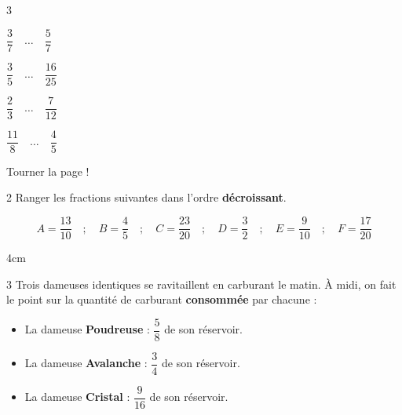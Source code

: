 \documentclass[a4paper]{book}
\begin{document}
{\begin{exerciceNote}{3}
        \begin{minipage}{0.24\linewidth}
            $\dfrac{3}{7} \quad \dots \quad \dfrac{5}{7}$
            \vspace{4cm}
        \end{minipage}
        \hfill\vline\hfill
        \begin{minipage}{0.24\linewidth}
            $\dfrac{3}{5} \quad \dots \quad \dfrac{16}{25}$
            \vspace{4cm}
        \end{minipage}        
        \hfill\vline\hfill
        \begin{minipage}{0.24\linewidth}
            $\dfrac{2}{3} \quad \dots \quad \dfrac{7}{12}$
            \vspace{4cm}
        \end{minipage}
        \hfill\vline\hfill
        \begin{minipage}{0.24\linewidth}
            $\dfrac{11}{8} \quad \dots \quad \dfrac{4}{5}$
            \vspace{4cm}
        \end{minipage}
    \end{exerciceNote}


\hfill Tourner la page !


\newpage


    \begin{exerciceNote}{2}
        Ranger les fractions suivantes dans l'ordre \textbf{décroissant}.
            
        \[ A = \frac{13}{10} \quad ; \quad B = \frac{4}{5} \quad ; \quad C = \frac{23}{20} \quad ; \quad D = \frac{3}{2} \quad ; \quad E = \frac{9}{10} \quad ; \quad F = \frac{17}{20} \]
        
        \begin{ZoneReponse}{4cm}
        \end{ZoneReponse}
    \end{exerciceNote}


    \begin{exerciceNote}{3}
        Trois dameuses identiques se ravitaillent en carburant le matin. À midi, on fait le point sur la quantité de carburant \textbf{consommée} par chacune :
        \begin{itemize}
            \item La dameuse \textbf{Poudreuse} : $\dfrac{5}{8}$ de son réservoir.
            \item La dameuse \textbf{Avalanche} : $\dfrac{3}{4}$ de son réservoir.
            \item La dameuse \textbf{Cristal} : $\dfrac{9}{16}$ de son réservoir.
        \end{itemize}
        

\end{exerciceNote}}
\end{document}
